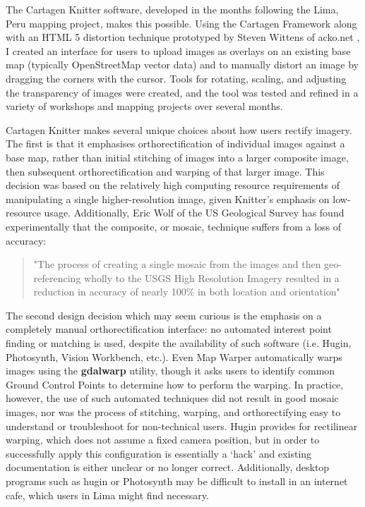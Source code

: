 \documentclass[11pt,oneside,notitlepage]{report}
\begin{document}
The Cartagen Knitter software, developed in the months following the Lima, Peru mapping project, makes this possible. Using the Cartagen Framework along with an HTML 5 distortion technique prototyped by Steven Wittens of acko.net \cite{wittens2008projective}, I created an interface for users to upload images as overlays on an existing base map (typically OpenStreetMap vector data) and to manually distort an image by dragging the corners with the cursor. Tools for rotating, scaling, and adjusting the transparency of images were created, and the tool was tested and refined in a variety of workshops and mapping projects over several months. 

Cartagen Knitter makes several unique choices about how users rectify imagery. The first is that it emphasises orthorectification of individual images against a base map, rather than initial stitching of images into a larger composite image, then subsequent orthorectification and warping of that larger image. This decision was based on the relatively high computing resource requirements of manipulating a single higher-resolution image, given Knitter's emphasis on low-resource usage. Additionally, Eric Wolf of the US Geological Survey has found experimentally that the composite, or mosaic, technique suffers from a loss of accuracy: 

\begin{quote}
"The process of creating a single mosaic from the images and then geo-referencing wholly to the USGS High Resolution Imagery resulted in a reduction in accuracy of nearly 100\% in both location and orientation"
\cite{wolf2006lowcost}
\end{quote}

The second design decision which may seem curious is the emphasis on a completely manual orthorectification interface: no automated interest point finding or matching is used, despite the availability of such software (i.e. Hugin, Photosynth, Vision Workbench, etc.). Even Map Warper automatically warps images using the \textbf{gdalwarp} utility, though it asks users to identify common Ground Control Points to determine how to perform the warping. In practice, however, the use of such automated techniques did not result in good mosaic images, nor was the process of stitching, warping, and orthorectifying easy to understand or troubleshoot for non-technical users. Hugin provides for rectilinear warping, which does not assume a fixed camera position, but in order to successfully apply this configuration is essentially a `hack' and existing documentation is either unclear or no longer correct. Additionally, desktop programs such as hugin or Photosynth may be difficult to install in an internet cafe, which users in Lima might find necessary.
\end{document}
